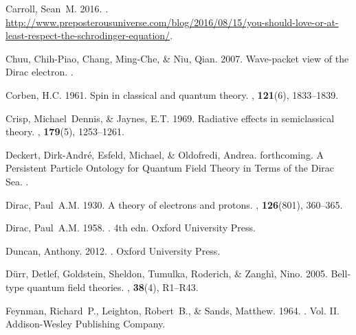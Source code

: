 \documentclass[onecolumn,secnumarabic,amsmath,amssymb,balancelastpage,nofootinbib]{article}
\begin{document}
\begin{thebibliography}{}
Carroll, Sean~M. 2016.
.
\newblock
  \url{http://www.preposterousuniverse.com/blog/2016/08/15/you-should-love-or-at-least-respect-the-schrodinger-equation/}.

Chuu, Chih-Piao, Chang, Ming-Che, \& Niu, Qian. 2007.
\newblock Wave-packet view of the Dirac electron.
.

Corben, H.C. 1961.
\newblock Spin in classical and quantum theory.
, {\bf 121}(6), 1833--1839.

Crisp, Michael~Dennis, \& Jaynes, E.T. 1969.
\newblock Radiative effects in semiclassical theory.
, {\bf 179}(5), 1253--1261.

Deckert, Dirk-Andr\'{e}, Esfeld, Michael, \& Oldofredi, Andrea. forthcoming.
\newblock A Persistent Particle Ontology for Quantum Field Theory in Terms of
  the Dirac Sea.
.

Dirac, Paul~A.M. 1930.
\newblock A theory of electrons and protons.
, {\bf 126}(801), 360--365.

Dirac, Paul~A.M. 1958.
. 4th edn.
\newblock Oxford University Press.

Duncan, Anthony. 2012.
.
\newblock Oxford University Press.

D{\"u}rr, Detlef, Goldstein, Sheldon, Tumulka, Roderich, \& Zangh\`{i}, Nino.
  2005.
\newblock Bell-type quantum field theories.
, {\bf 38}(4),
  R1--R43.

Feynman, Richard~P., Leighton, Robert~B., \& Sands, Matthew. 1964.
.
\newblock  Vol. II.
\newblock Addison-Wesley Publishing Company.


\end{thebibliography}
\end{document}
